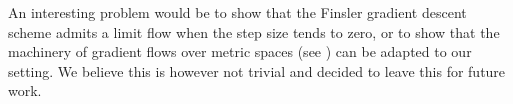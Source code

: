  
 
 
 \begin{rem}\label{grad_flow}An interesting problem would be to show that the Finsler gradient descent scheme admits a limit flow when the step size tends to zero, or to show that the machinery of gradient flows over metric spaces (see \cite{AGS}) can be adapted to our setting. We believe this is however not trivial and decided to leave this for future work. 
 \end{rem}
